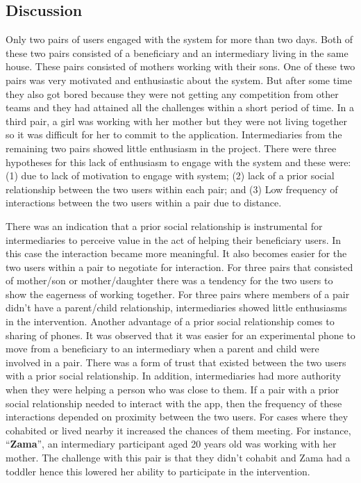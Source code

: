\subsection{Discussion}
Only two pairs of users engaged with the system for more than two days. Both of these two pairs consisted of a beneficiary and an  intermediary living in the same house. These pairs consisted of mothers working with their sons. One of these two pairs was very motivated and enthusiastic about the system. But after some time they also got bored because they were not getting any competition from other teams and they had attained all the challenges within a short period of time. In a third pair, a girl was working with her mother but they were not living together so it was difficult for her to commit to the application. Intermediaries from the remaining two pairs showed little enthusiasm in the project. There were three hypotheses for this lack of enthusiasm to engage with the system and these were: (1) due to lack of motivation to engage with system; (2) lack of a prior social relationship between the two users within each pair; and (3) Low frequency of interactions between the two users within a pair due to distance.

There was an indication that a prior social relationship is instrumental for intermediaries to perceive value in the act of helping their beneficiary users. In this case the interaction became more meaningful. It also becomes easier for the two users within a pair to negotiate for interaction. For three pairs that consisted of mother/son or mother/daughter there was a tendency for the two users to show the eagerness of working together. For three pairs where members of a pair didn't  have a parent/child relationship, intermediaries showed little enthusiasms in the intervention. Another advantage of a prior social relationship comes to sharing of phones. It was observed that it was easier for an experimental phone to move from a beneficiary to an intermediary when a parent and child were involved in a pair. There was a form of trust that existed between the two users with a prior social relationship. In addition, intermediaries had more authority when they were helping a person who was close to them. If a pair with a prior social relationship needed to interact with the app, then the frequency of these interactions depended on proximity between the two users. For cases where they cohabited or lived nearby it increased the chances of them meeting. For instance, ``\textbf{Zama}'', an intermediary participant aged 20 years old was working with her mother. The challenge with this pair is that they didn't cohabit and Zama had a toddler hence this lowered her ability to participate in the intervention.  

